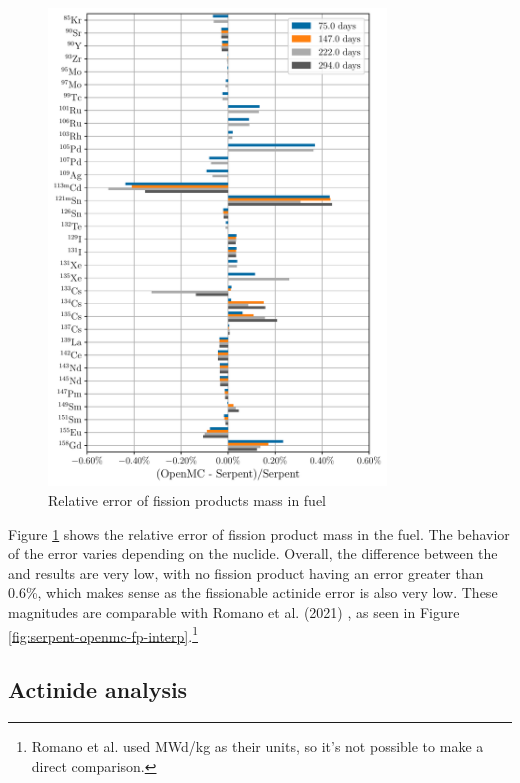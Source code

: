 \begin{figure}[htpb]
    \centering
    \includegraphics[width=0.8\textwidth]{figs/ch5/fission_products.pdf}
    \caption{Relative error of fission products mass in fuel}
    \label{fig:fission-products}
\end{figure}

Figure \ref{fig:fission-products} shows the relative error of fission product
mass in the fuel. The behavior of the error varies depending on the nuclide.
Overall, the difference between the \OpenMC and \SerpentTWO results are
very low, with no fission product having an error greater than 0.6\%, 
which makes sense as the fissionable actinide error is also very low. These
magnitudes are comparable with Romano et al. (2021) \cite{romano_depletion_2021}, 
as seen in Figure \ref{fig:serpent-openmc-fp-interp}.\footnote{Romano
et al. used MWd/kg as their units, so it's not possible to make a direct comparison.}


\subsection{Actinide analysis}
\label{sub:actinide-analysis}

